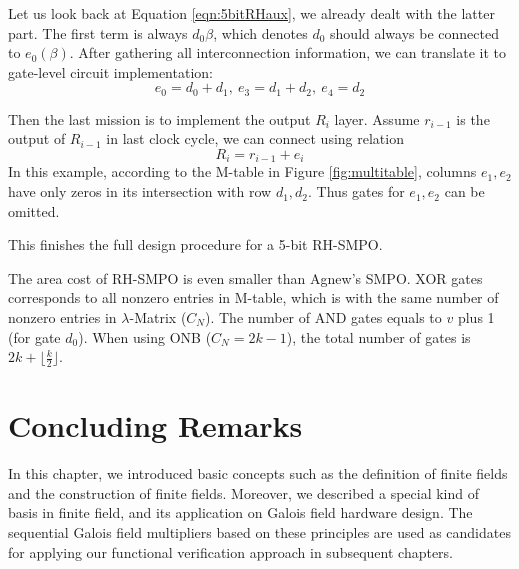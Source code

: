 \begin{Example}
Let us look back at Equation \ref{eqn:5bitRHaux}, we already dealt with the latter part.
The first term is always $d_0\beta$, which denotes $d_0$ should always be connected to $e_0(\beta)$.
After gathering all interconnection information, we can translate it to gate-level circuit implementation:
$$e_0 = d_0+d_1,~e_3=d_1+d_2,~e_4=d_2$$

Then the last mission is to implement the output $R_i$ layer. Assume $r_{i-1}$ is the output of 
$R_{i-1}$ in last clock cycle, we can connect using relation 
$$R_i = r_{i-1} + e_i$$
In this example, according to the M-table in Figure \ref{fig:multitable}, columns $e_1,e_2$
have only zeros in its intersection with row $d_1,d_2$. Thus gates for $e_1,e_2$ can be omitted.

This finishes the full design procedure for a 5-bit RH-SMPO.
\end{Example}

The area cost of RH-SMPO is even smaller than Agnew's SMPO. XOR gates corresponds to all nonzero entries 
in M-table, which is with the same number of nonzero entries in $\lambda$-Matrix ($C_N$). The number of AND gates 
equals to $v$ plus 1 (for gate $d_0$). When using ONB ($C_N = 2k-1$), the total number of gates 
is $2k+\lfloor \frac{k}{2}\rfloor$.

\section{Concluding Remarks}
In this chapter, we introduced basic concepts such as the definition of finite fields and the construction 
of finite fields. Moreover, we described a special kind of basis in finite field, and its 
application on Galois field hardware design. The sequential Galois field multipliers based on these 
principles are used as candidates for applying our functional verification approach in subsequent chapters.